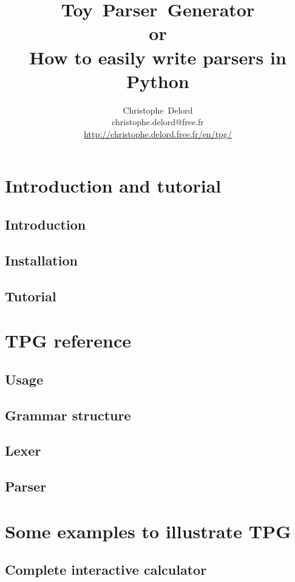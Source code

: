 \documentclass[a4paper,twoside]{report}
\author{
	Christophe~Delord \\
	christophe.delord@free.fr \\
	\url{http://christophe.delord.free.fr/en/tpg/} \\
}
\title{
	Toy~Parser~Generator \\
	or\\
	How to easily write parsers in Python \\
}
\begin{document}
\maketitle
\tableofcontents

\listoffigures

\cleardoublepage
\part{Introduction and tutorial}
\label{tpg:intro}
	\chapter{Introduction}
		
	\chapter{Installation}
		
	\chapter{Tutorial}
	\label{tpg:tutorial}
		

\cleardoublepage
\part{TPG reference}
\label{tpg:core}
	\chapter{Usage}
		
	\chapter{Grammar structure}
		
	\chapter{Lexer}
		
	\chapter{Parser}
		

\cleardoublepage
\part{Some examples to illustrate TPG}
\label{tpg:examples}
	\chapter{Complete interactive calculator}
		
\end{document}

